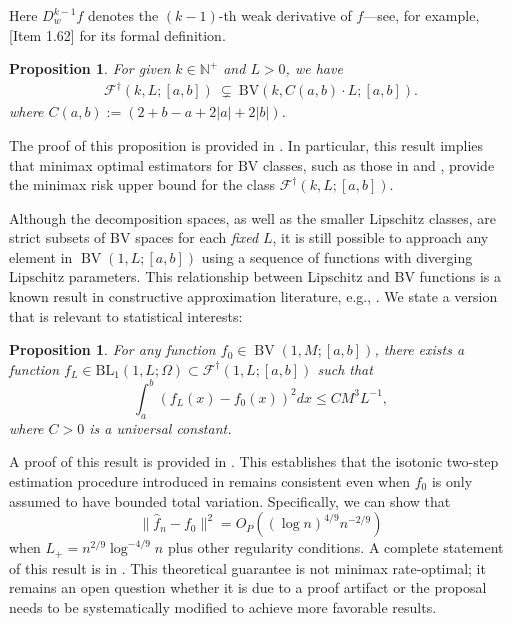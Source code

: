 \documentclass[12pt]{article}
\newtheorem{proposition}[theorem]{Proposition}
\begin{document}
Here $D_w^{k-1}f$ denotes the $(k-1)$-th weak derivative of $f$---see, for example, \cite{adams2003sobolev}[Item 1.62] for its formal definition.

\begin{proposition}\label{prop:k-bv}
For given $k\in\mathbb{N}^+$ and $L > 0$, we have
\begin{align}
\mathcal{F}^\dag(k, L;[a,b])~\subsetneq~ \mathrm{BV}(k, C(a,b)\cdot L;[a,b]).
    \end{align}
    where $C(a,b) := (2+b-a+2|a| + 2|b|)$.
\end{proposition}
The proof of this proposition is provided in . In particular, this result implies that minimax optimal estimators for $\mathrm{BV}$ classes, such as those in \cite{mammen1997locally} and \cite{tibshirani2014adaptive}, provide the minimax risk upper bound for the class $\mathcal{F}^\dagger(k,L; [a, b])$.


Although the decomposition spaces, as well as the smaller Lipschitz classes, are strict subsets of BV spaces for each \textit{fixed} $L$, it is still possible to approach any element in $\operatorname{BV}(1,L;[a,b])$ using a sequence of functions with diverging Lipschitz parameters. This relationship between Lipschitz and BV functions is a known result in constructive approximation literature, e.g., \citep[Section 6.6.2, Theorem 2]{evans2018measure}. We state a version that is relevant to statistical interests:
\begin{proposition}\label{prop: BV approximation}
For any function $f_0 \in \operatorname{BV}(1, M;[a,b])$, there exists a function $f_{L}\in\mathrm{BL}_1(1, L ; \Omega)\subset\mathcal{F}^\dagger(1,L;[a,b])$ such that 
\begin{equation*}
\int_a^b\left(f_L(x)-f_0(x)\right)^2 d x \leq CM^3 L^{-1},
\end{equation*}
where $C>0$ is a universal constant.
\end{proposition}
A proof of this result is provided in . This establishes that the isotonic two-step estimation procedure introduced in  remains consistent even when $f_0$ is only assumed to have bounded total variation. Specifically, we can show that 
\begin{equation*}
\|\widehat{f}_n-f_0\|^2=O_P\left((\log n)^{4 / 9} n^{-2 / 9}\right)
\end{equation*}
when $L_+ = n^{2/9} \log^{-4/9} n$ plus other regularity conditions. A complete statement of this result is in . This theoretical guarantee is not minimax rate-optimal; it remains an open question whether it is due to a proof artifact or the proposal needs to be systematically modified to achieve more favorable results.
\end{document}
